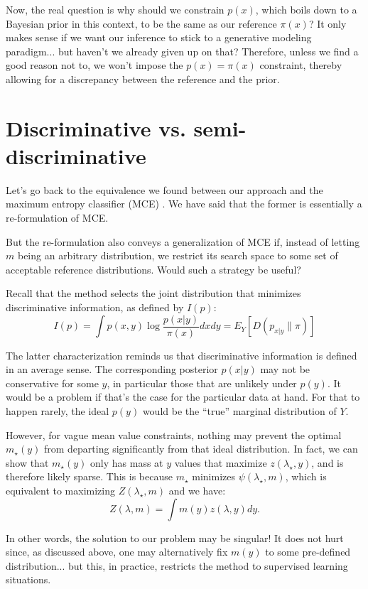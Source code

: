 \documentclass[english]{scrartcl}
\begin{document}
Now, the real question is why should we constrain $p(x)$, which boils
down to a Bayesian prior in this context, to be the same as our
reference $\pi(x)$? It only makes sense if we want our inference to
stick to a generative modeling paradigm... but haven't we already
given up on that? Therefore, unless we find a good reason not to, we
won't impose the $p(x)=\pi(x)$ constraint, thereby allowing for a
discrepancy between the reference and the prior.


\section{Discriminative vs. semi-discriminative}

Let's go back to the equivalence we found between our approach and the
maximum entropy classifier (MCE) \cite{BergerA-96}. We have said that
the former is essentially a re-formulation of MCE.

But the re-formulation also conveys a generalization of MCE if,
instead of letting $m$ being an arbitrary distribution, we restrict
its search space to some set of acceptable reference
distributions. Would such a strategy be useful? 

Recall that the method selects the joint distribution that minimizes
discriminative information, as defined by $I(p)$:
$$
I(p) 
= \int p(x,y)\log\frac{p(x|y)}{\pi(x)} dxdy
= E_Y[D(p_{x|y}\|\pi)]
$$

The latter characterization reminds us that discriminative information
is defined in an average sense. The corresponding posterior $p(x|y)$
may not be conservative for some $y$, in particular those that are
unlikely under $p(y)$. It would be a problem if that's the case for
the particular data at hand. For that to happen rarely, the ideal
$p(y)$ would be the ``true'' marginal distribution of $Y$.

However, for vague mean value constraints, nothing may prevent the
optimal $m_\star(y)$ from departing significantly from that ideal
distribution. In fact, we can show that $m_\star(y)$ only has mass at
$y$ values that maximize $z(\lambda_\star,y)$, and is therefore likely
sparse. This is because $m_\star$ minimizes $\psi(\lambda_\star,m)$,
which is equivalent to maximizing $Z(\lambda_\star,m)$ and we have:
$$
Z(\lambda, m) = \int m(y) z(\lambda, y) dy.
$$

In other words, the solution to our problem may be singular! It does
not hurt since, as discussed above, one may alternatively fix $m(y)$
to some pre-defined distribution... but this, in practice, restricts
the method to supervised learning situations.
\end{document}
